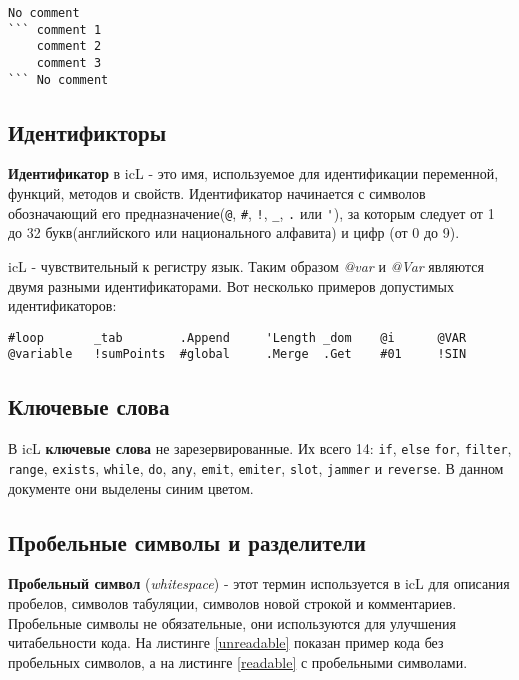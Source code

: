 \documentclass[a4paper, 14pt]{extarticle}
\begin{document}
\begin{lstlisting}[caption=Многострочный комментарий,label=multilinecomment]
No comment
``` comment 1
	comment 2
	comment 3
``` No comment
\end{lstlisting}

\subsection{Идентификторы}

\textbf{Идентификатор} в icL - это имя, используемое для идентификации переменной, функций, методов и свойств. Идентификатор начинается с символов обозначающий его предназначение(\lstinline`@`, \lstinline`#`, \lstinline`!`, \lstinline`_`, \lstinline`.` или \lstinline`'`), за которым следует от 1 до 32 букв(английского или национального алфавита) и цифр (от 0 до 9).

icL - чувствительный к регистру язык. Таким образом \textit{@var} и \textit{@Var} являются двумя разными идентификаторами. Вот несколько примеров допустимых идентификаторов:

\begin{lstlisting}[numbers=none]
#loop		_tab		.Append		'Length	_dom	@i	 	@VAR
@variable	!sumPoints	#global		.Merge	.Get	#01		!SIN
\end{lstlisting}

\subsection{Ключевые слова}

В icL \textbf{ключевые слова} не зарезервированные. Их всего 14: \lstinline`if`, \lstinline|else| \lstinline`for`, \lstinline`filter`, \lstinline`range`, \lstinline`exists`, \lstinline`while`, \lstinline`do`, \lstinline`any`, \lstinline`emit`, \lstinline`emiter`, \lstinline`slot`, \lstinline|jammer| и \lstinline|reverse|. В данном документе они выделены синим цветом.

\subsection{Пробельные символы и разделители}

\textbf{Пробельный символ} (\textit{whitespace}) - этот термин используется в icL для описания пробелов, символов табуляции, символов новой строкой и комментариев. Пробельные символы не обязательные, они используются для улучшения читабельности кода. На листинге \ref{unreadable} показан пример кода без пробельных символов, а на листинге \ref{readable} с пробельными символами.
\end{document}
